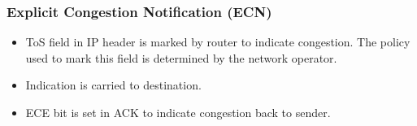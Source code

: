 \subsubsection{Explicit Congestion Notification (ECN)}

\begin{itemize}
    \item ToS field in IP header is marked by router to indicate congestion. The policy used to mark this field is determined by the network operator.
    \item Indication is carried to destination.
    \item ECE bit is set in ACK to indicate congestion back to sender.
\end{itemize}